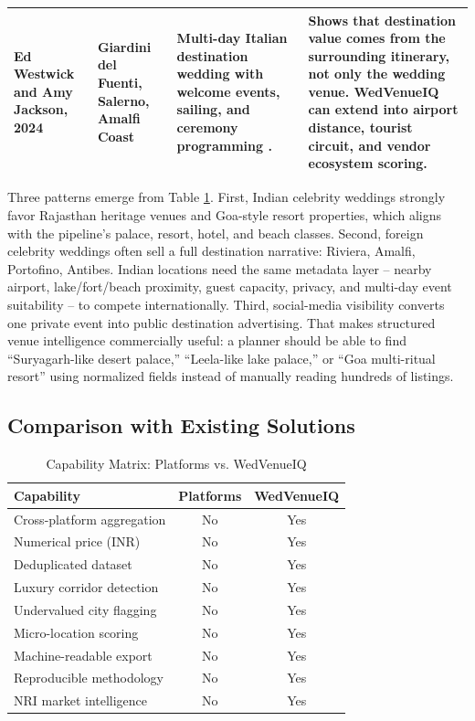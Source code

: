 \documentclass[conference]{IEEEtran}
\begin{document}
\begin{table}[htbp]
\begin{center}
\begin{tabular}{|p{}|p{}|p{}|p{}|}
\hline
Ed Westwick and Amy Jackson, 2024 & Giardini del Fuenti, Salerno, Amalfi Coast & Multi-day Italian destination wedding with welcome events, sailing, and ceremony programming \cite{b22}. & Shows that destination value comes from the surrounding itinerary, not only the wedding venue. WedVenueIQ can extend into airport distance, tourist circuit, and vendor ecosystem scoring. \\
\hline
\end{tabular}
\label{tab:celebrity-benchmarks}
\end{center}
\end{table}

Three patterns emerge from Table \ref{tab:celebrity-benchmarks}. First, Indian celebrity weddings strongly favor Rajasthan heritage venues and Goa-style resort properties, which aligns with the pipeline's palace, resort, hotel, and beach classes. Second, foreign celebrity weddings often sell a full destination narrative: Riviera, Amalfi, Portofino, Antibes. Indian locations need the same metadata layer -- nearby airport, lake/fort/beach proximity, guest capacity, privacy, and multi-day event suitability -- to compete internationally. Third, social-media visibility converts one private event into public destination advertising. That makes structured venue intelligence commercially useful: a planner should be able to find ``Suryagarh-like desert palace,'' ``Leela-like lake palace,'' or ``Goa multi-ritual resort'' using normalized fields instead of manually reading hundreds of listings.

\subsection{Comparison with Existing Solutions}

\begin{table}[htbp]
\caption{Capability Matrix: Platforms vs. WedVenueIQ}
\begin{center}
\begin{tabular}{|l|c|c|}
\hline
\textbf{Capability} & \textbf{Platforms} & \textbf{WedVenueIQ} \\
\hline
Cross-platform aggregation & No & Yes \\
\hline
Numerical price (INR) & No & Yes \\
\hline
Deduplicated dataset & No & Yes \\
\hline
Luxury corridor detection & No & Yes \\
\hline
Undervalued city flagging & No & Yes \\
\hline
Micro-location scoring & No & Yes \\
\hline
Machine-readable export & No & Yes \\
\hline
Reproducible methodology & No & Yes \\
\hline
NRI market intelligence & No & Yes \\
\hline
\end{tabular}
\label{tab:comparison}
\end{center}
\end{table}
\end{document}
